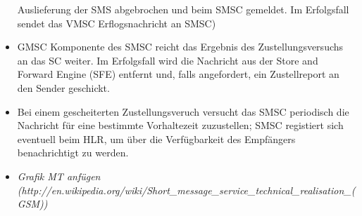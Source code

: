 \documentclass[german,12pt,a4paper]{article}
\begin{document}
\begin{itemize}
		Auslieferung der SMS abgebrochen und beim SMSC gemeldet. Im Erfolgsfall sendet das VMSC Erflogsnachricht an SMSC)
	\item GMSC Komponente des SMSC reicht das Ergebnis des Zustellungsversuchs an das SC 
		weiter. Im Erfolgsfall wird die Nachricht aus der Store and Forward Engine (SFE) 
		entfernt und, falls angefordert, ein Zustellreport an den Sender geschickt.
	\item Bei einem gescheiterten Zustellungsveruch versucht das SMSC periodisch die 
		Nachricht für eine bestimmte Vorhaltezeit zuzustellen; SMSC registiert sich 
		eventuell beim HLR, um über die Verfügbarkeit des Empfängers benachrichtigt zu 
		werden.
	\item \textit{Grafik MT anfügen \\(http://en.wikipedia.org/wiki/Short\_message\_service\_technical\_realisation\_(GSM))}
\end{itemize}
\end{document}
